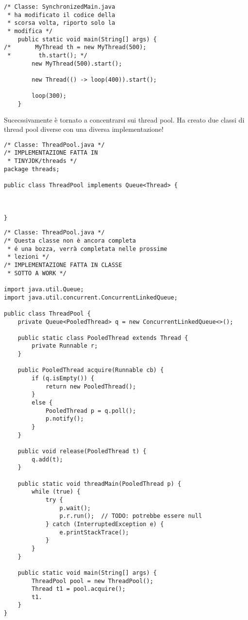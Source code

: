 \begin{lstlisting}
/* Classe: SynchronizedMain.java 
 * ha modificato il codice della 
 * scorsa volta, riporto solo la
 * modifica */
    public static void main(String[] args) {
/*       MyThread th = new MyThread(500);
 *        th.start(); */
        new MyThread(500).start();

        new Thread(() -> loop(400)).start();

        loop(300);
    }
\end{lstlisting}

\noindent Sucecssivamente è tornato a concentrarsi sui thread pool. \newline
Ha creato due classi di thread pool diverse con una diversa implementazione!

\begin{lstlisting}
/* Classe: ThreadPool.java */
/* IMPLEMENTAZIONE FATTA IN 
 * TINYJDK/threads */
package threads;

public class ThreadPool implements Queue<Thread> {



}

\end{lstlisting}

\begin{lstlisting}
/* Classe: ThreadPool.java */
/* Questa classe non è ancora completa 
 * é una bozza, verrà completata nelle prossime
 * lezioni */
/* IMPLEMENTAZIONE FATTA IN CLASSE 
 * SOTTO A WORK */
 
import java.util.Queue;
import java.util.concurrent.ConcurrentLinkedQueue;

public class ThreadPool {
    private Queue<PooledThread> q = new ConcurrentLinkedQueue<>();

    public static class PooledThread extends Thread {
        private Runnable r;
    }

    public PooledThread acquire(Runnable cb) {
        if (q.isEmpty()) {
            return new PooledThread();
        }
        else {
            PooledThread p = q.poll();
            p.notify();
        }
    }

    public void release(PooledThread t) {
        q.add(t);
    }

    public static void threadMain(PooledThread p) {
        while (true) {
            try {
                p.wait();
                p.r.run();  // TODO: potrebbe essere null
            } catch (InterruptedException e) {
                e.printStackTrace();
            }
        }
    }

    public static void main(String[] args) {
        ThreadPool pool = new ThreadPool();
        Thread t1 = pool.acquire();
        t1.
    }
}


\end{lstlisting}




